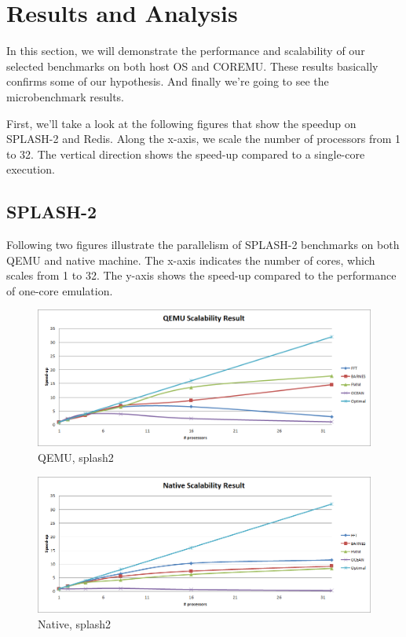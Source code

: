 \section{Results and Analysis}
\label{sec:res}

In this section, we will demonstrate the performance and scalability of our 
selected benchmarks on both host OS and COREMU. These results basically confirms
some of our hypothesis. And finally we're going to see the microbenchmark results. 

First, we'll take a look at the following figures that show the speedup on 
SPLASH-2 and Redis. 
Along the x-axis, we scale the number of processors from 1 to 32. 
The vertical direction shows the speed-up compared to a single-core execution. 

\subsection{SPLASH-2}

Following two figures illustrate the parallelism of SPLASH-2 benchmarks on both QEMU
and native machine. The x-axis indicates the number of cores, which scales from 1
to 32. The y-axis shows the speed-up compared to the performance of one-core
emulation.

\begin{figure}[H]
\center
\includegraphics[width=0.8\linewidth]{figures/qm_splash2.png}
\caption{QEMU, splash2}
\label{fig:splash2_vm}
\end{figure}

\begin{figure}[H]
\center
\includegraphics[width=0.8\linewidth]{figures/native_splash2.png}
\caption{Native, splash2}
\label{fig:splash2_native}
\end{figure}

